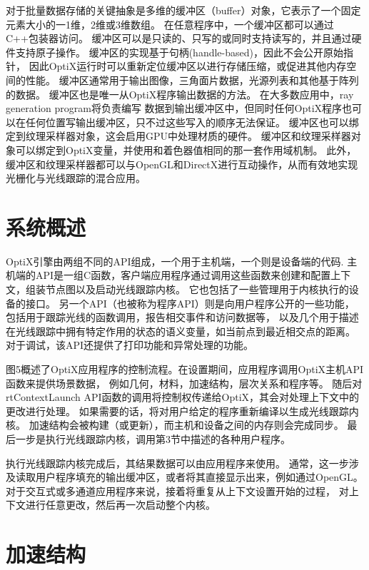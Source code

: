 对于批量数据存储的关键抽象是多维的缓冲区（buffer）对象，它表示了一个固定元素大小的一1维，2维或3维数组。
在任意程序中，一个缓冲区都可以通过C++包装器访问。
缓冲区可以是只读的、只写的或同时支持读写的，并且通过硬件支持原子操作。
缓冲区的实现基于句柄(handle-based)，因此不会公开原始指针，
因此OptiX运行时可以重新定位缓冲区以进行存储压缩，或促进其他内存空间的性能。
缓冲区通常用于输出图像，三角面片数据，光源列表和其他基于阵列的数据。
缓冲区也是唯一从OptiX程序输出数据的方法。
在大多数应用中，ray generation program将负责编写
数据到输出缓冲区中，但同时任何OptiX程序也可以在任何位置写输出缓冲区，只不过这些写入的顺序无法保证。
缓冲区也可以绑定到纹理采样器对象，这会启用GPU中处理材质的硬件。
缓冲区和纹理采样器对象可以绑定到OptiX变量，并使用和着色器值相同的那一套作用域机制。
此外，缓冲区和纹理采样器都可以与OpenGL和DirectX进行互动操作，从而有效地实现光栅化与光线跟踪的混合应用。

\section{系统概述}

OptiX引擎由两组不同的API组成，一个用于主机端，一个则是设备端的代码.
主机端的API是一组C函数，客户端应用程序通过调用这些函数来创建和配置上下文，组装节点图以及启动光线跟踪内核。
它也包括了一些管理用于内核执行的设备的接口。
另一个API（也被称为程序API）则是向用户程序公开的一些功能，
包括用于跟踪光线的函数调用，报告相交事件和访问数据等，
以及几个用于描述在光线跟踪中拥有特定作用的状态的语义变量，如当前点到最近相交点的距离。
对于调试，该API还提供了打印功能和异常处理的功能。

图5概述了OptiX应用程序的控制流程。在设置期间，应用程序调用OptiX主机API函数来提供场景数据，
例如几何，材料，加速结构，层次关系和程序等。
随后对rtContextLaunch API函数的调用将控制权传递给OptiX，其会对处理上下文中的更改进行处理。
如果需要的话，将对用户给定的程序重新编译以生成光线跟踪内核。
加速结构会被构建（或更新），而主机和设备之间的内存则会完成同步。
最后一步是执行光线跟踪内核，调用第3节中描述的各种用户程序。

执行光线跟踪内核完成后，其结果数据可以由应用程序来使用。
通常，这一步涉及读取用户程序填充的输出缓冲区，或者将其直接显示出来，例如通过OpenGL。
对于交互式或多通道应用程序来说，接着将重复从上下文设置开始的过程，
对上下文进行任意更改，然后再一次启动整个内核。

\section{加速结构}

